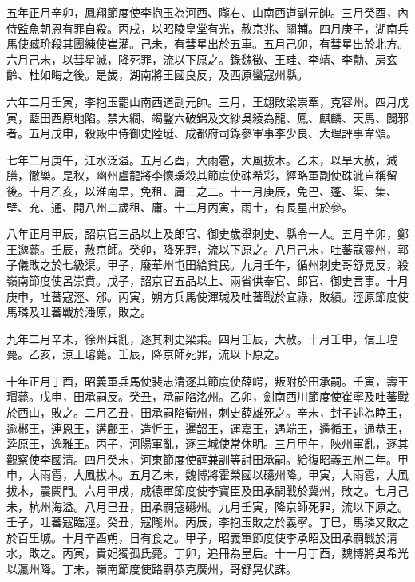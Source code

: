 \begin{pinyinscope}
 五年正月辛卯，鳳翔節度使李抱玉為河西、隴右、山南西道副元帥。三月癸酉，內侍監魚朝恩有罪自殺。丙戌，以昭陵皇堂有光，赦京兆、關輔。四月庚子，湖南兵馬使臧玠殺其團練使崔灌。己未，有彗星出於五車。五月己卯，有彗星出於北方。六月己未，以彗星滅，降死罪，流以下原之。錄魏徵、王珪、李靖、李勣、房玄齡、杜如晦之後。是歲，湖南將王國良反，及西原蠻寇州縣。



 六年二月壬寅，李抱玉罷山南西道副元帥。三月，王翃敗梁崇牽，克容州。四月戊寅，藍田西原地陷。禁大繝、竭鑿六破錦及文紗吳綾為龍、鳳、麒麟、天馬、闢邪者。五月戊申，殺殿中侍御史陸珽、成都府司錄參軍事李少良、大理評事韋頌。



 七年二月庚午，江水泛溢。五月乙酉，大雨雹，大風拔木。乙未，以旱大赦，減膳，徹樂。是秋，幽州盧龍將李懷瑗殺其節度使硃希彩，經略軍副使硃泚自稱留後。十月乙亥，以淮南旱，免租、庸三之二。十一月庚辰，免巴、蓬、渠、集、壁、充、通、開八州二歲租、庸。十二月丙寅，雨土，有長星出於參。



 八年正月甲辰，詔京官三品以上及郎官、御史歲舉刺史、縣令一人。五月辛卯，鄭王邈薨。壬辰，赦京師。癸卯，降死罪，流以下原之。八月己未，吐蕃寇靈州，郭子儀敗之於七級渠。甲子，廢華州屯田給貧民。九月壬午，循州刺史哥舒晃反，殺嶺南節度使呂崇賁。戊子，詔京官五品以上、兩省供奉官、郎官、御史言事。十月庚申，吐蕃寇涇、邠。丙寅，朔方兵馬使渾瑊及吐蕃戰於宜祿，敗績。涇原節度使馬璘及吐蕃戰於潘原，敗之。



 九年二月辛未，徐州兵亂，逐其刺史梁乘。四月壬辰，大赦。十月壬申，信王瑝薨。乙亥，涼王璿薨。壬辰，降京師死罪，流以下原之。



 十年正月丁酉，昭義軍兵馬使裴志清逐其節度使薛崿，叛附於田承嗣。壬寅，壽王瑁薨。戊申，田承嗣反。癸丑，承嗣陷洺州。乙卯，劍南西川節度使崔寧及吐蕃戰於西山，敗之。二月乙丑，田承嗣陷衛州，刺史薛雄死之。辛未，封子述為睦王，逾郴王，連恩王，遘鄜王，造忻王，暹韶王，運嘉王，遇端王，遹循王，通恭王，逵原王，逸雅王。丙子，河陽軍亂，逐三城使常休明。三月甲午，陜州軍亂，逐其觀察使李國清。四月癸未，河東節度使薛兼訓等討田承嗣。給復昭義五州二年。甲申，大雨雹，大風拔木。五月乙未，魏博將霍榮國以礠州降。甲寅，大雨雹，大風拔木，震闕門。六月甲戌，成德軍節度使李寶臣及田承嗣戰於冀州，敗之。七月己未，杭州海溢。八月巳丑，田承嗣寇礠州。九月壬寅，降京師死罪，流以下原之。壬子，吐蕃寇臨涇。癸丑，寇隴州。丙辰，李抱玉敗之於義寧。丁巳，馬璘又敗之於百里城。十月辛酉朔，日有食之。甲子，昭義軍節度使李承昭及田承嗣戰於清水，敗之。丙寅，貴妃獨孤氏薨。丁卯，追冊為皇后。十一月丁酉，魏博將吳希光以瀛州降。丁未，嶺南節度使路嗣恭克廣州，哥舒晃伏誅。




\end{pinyinscope}
